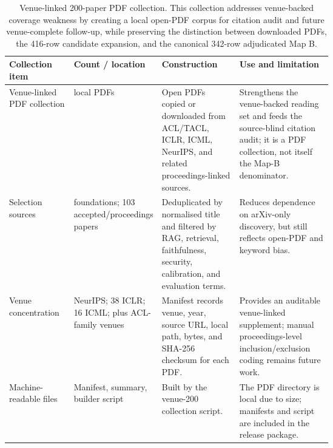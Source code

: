 \begin{table}[t]
\centering
\scriptsize
\renewcommand{\arraystretch}{0.9}
\begin{tabularx}{\linewidth}{>{\raggedright\arraybackslash}p{0.20\linewidth}>{\raggedright\arraybackslash}p{0.18\linewidth}>{\raggedright\arraybackslash}p{0.24\linewidth}X}
\toprule
\textbf{Collection item} & \textbf{Count / location} & \textbf{Construction} & \textbf{Use and limitation} \\
\midrule
Venue-linked PDF collection & 200 local PDFs & Open PDFs copied or downloaded from ACL/TACL, ICLR, ICML, NeurIPS, and related proceedings-linked sources. & Strengthens the venue-backed reading set and feeds the source-blind citation audit; it is a PDF collection, not itself the Map-B denominator. \\
Selection sources & 97 foundations; 103 accepted/proceedings papers & Deduplicated by normalised title and filtered by RAG, retrieval, faithfulness, security, calibration, and evaluation terms. & Reduces dependence on arXiv-only discovery, but still reflects open-PDF and keyword bias. \\
Venue concentration & 49 NeurIPS; 38 ICLR; 16 ICML; plus ACL-family venues & Manifest records venue, year, source URL, local path, bytes, and SHA-256 checksum for each PDF. & Provides an auditable venue-linked supplement; manual proceedings-level inclusion/exclusion coding remains future work. \\
Machine-readable files & Manifest, summary, builder script & Built by the venue-200 collection script. & The PDF directory is local due to size; manifests and script are included in the release package. \\
\bottomrule
\end{tabularx}
\caption{Venue-linked 200-paper PDF collection. This collection addresses venue-backed coverage weakness by creating a local open-PDF corpus for citation audit and future venue-complete follow-up, while preserving the distinction between downloaded PDFs, the 416-row candidate expansion, and the canonical 342-row adjudicated Map B.}
\label{tab:venue-200-collection}
\end{table}
